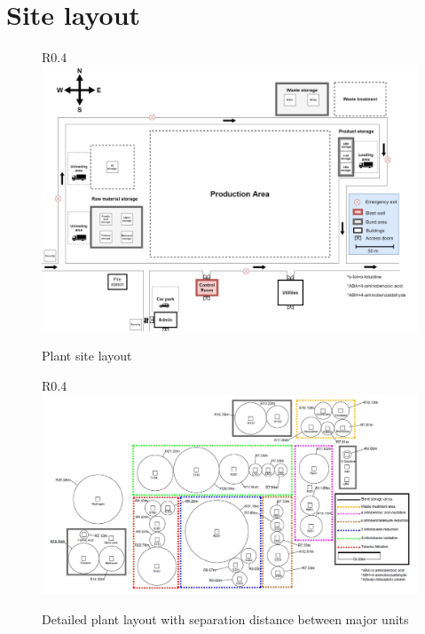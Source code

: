 \section{Site layout}


\begin{figure}{R}{0.4\linewidth}
\centering
\includegraphics[width=\linewidth]{chapters/Z-support/figures/Sitelayout.jpg}
\caption{Plant site layout}
\label{fig:site}
\end{figure}

\begin{figure}{R}{0.4\linewidth}
\centering
\includegraphics[width=\linewidth]{chapters/Z-support/figures/detailedlayout.jpg}
\caption{Detailed plant layout with separation distance between major units}
\label{fig:detailed_layout}
\end{figure}